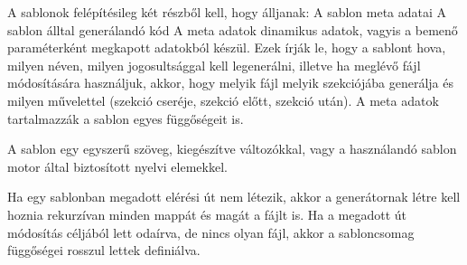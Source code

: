 \documentclass[a4paper,12pt,oneside]{report}
\begin{document}
\begin{justify}
	A sablonok felépítésileg két részből kell, hogy álljanak:
	A sablon meta adatai
	A sablon álltal generálandó kód
	A meta adatok dinamikus adatok, vagyis a bemenő paraméterként megkapott adatokból készül. Ezek írják le, hogy a sablont hova, milyen néven, milyen jogosultsággal kell legenerálni, illetve ha meglévő fájl módosítására használjuk, akkor, hogy melyik fájl melyik szekciójába generálja és milyen művelettel (szekció cseréje, szekció előtt, szekció után). A meta adatok tartalmazzák a sablon egyes függőségeit is. 

	A sablon egy egyszerű szöveg, kiegészítve változókkal, vagy a használandó sablon motor által biztosított nyelvi elemekkel.

	Ha egy sablonban megadott elérési út nem létezik, akkor a generátornak létre kell hoznia rekurzívan minden mappát és magát a fájlt is. Ha a megadott út módosítás céljából lett odaírva, de nincs olyan fájl, akkor a sabloncsomag függőségei rosszul lettek definiálva.

\end{justify}

\newpage
\end{document}
